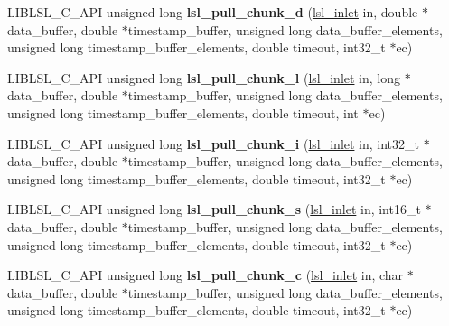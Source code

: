 \begin{DoxyCompactItemize}
\item 
\mbox{\label{namespacelsl_ad8e4cbb24fb74cd532abf50fe3a8d571}} 
L\+I\+B\+L\+S\+L\+\_\+\+C\+\_\+\+A\+PI unsigned long {\bfseries lsl\+\_\+pull\+\_\+chunk\+\_\+d} (\hyperlink{namespacelsl_a884a3363cfcba75d7ce8f00c1c4c54f1}{lsl\+\_\+inlet} in, double $\ast$data\+\_\+buffer, double $\ast$timestamp\+\_\+buffer, unsigned long data\+\_\+buffer\+\_\+elements, unsigned long timestamp\+\_\+buffer\+\_\+elements, double timeout, int32\+\_\+t $\ast$ec)
\item 
\mbox{\label{namespacelsl_a1f78178ddd5cb824e36d4322677bbfe9}} 
L\+I\+B\+L\+S\+L\+\_\+\+C\+\_\+\+A\+PI unsigned long {\bfseries lsl\+\_\+pull\+\_\+chunk\+\_\+l} (\hyperlink{namespacelsl_a884a3363cfcba75d7ce8f00c1c4c54f1}{lsl\+\_\+inlet} in, long $\ast$data\+\_\+buffer, double $\ast$timestamp\+\_\+buffer, unsigned long data\+\_\+buffer\+\_\+elements, unsigned long timestamp\+\_\+buffer\+\_\+elements, double timeout, int $\ast$ec)
\item 
\mbox{\label{namespacelsl_a5f10ff6b4a4ff08c0e9f78d41c495c60}} 
L\+I\+B\+L\+S\+L\+\_\+\+C\+\_\+\+A\+PI unsigned long {\bfseries lsl\+\_\+pull\+\_\+chunk\+\_\+i} (\hyperlink{namespacelsl_a884a3363cfcba75d7ce8f00c1c4c54f1}{lsl\+\_\+inlet} in, int32\+\_\+t $\ast$data\+\_\+buffer, double $\ast$timestamp\+\_\+buffer, unsigned long data\+\_\+buffer\+\_\+elements, unsigned long timestamp\+\_\+buffer\+\_\+elements, double timeout, int32\+\_\+t $\ast$ec)
\item 
\mbox{\label{namespacelsl_a577a886ca87effb6b93a295466b9c933}} 
L\+I\+B\+L\+S\+L\+\_\+\+C\+\_\+\+A\+PI unsigned long {\bfseries lsl\+\_\+pull\+\_\+chunk\+\_\+s} (\hyperlink{namespacelsl_a884a3363cfcba75d7ce8f00c1c4c54f1}{lsl\+\_\+inlet} in, int16\+\_\+t $\ast$data\+\_\+buffer, double $\ast$timestamp\+\_\+buffer, unsigned long data\+\_\+buffer\+\_\+elements, unsigned long timestamp\+\_\+buffer\+\_\+elements, double timeout, int32\+\_\+t $\ast$ec)
\item 
\mbox{\label{namespacelsl_ad160ae0261a0b604b5ebae8a7cf30f00}} 
L\+I\+B\+L\+S\+L\+\_\+\+C\+\_\+\+A\+PI unsigned long {\bfseries lsl\+\_\+pull\+\_\+chunk\+\_\+c} (\hyperlink{namespacelsl_a884a3363cfcba75d7ce8f00c1c4c54f1}{lsl\+\_\+inlet} in, char $\ast$data\+\_\+buffer, double $\ast$timestamp\+\_\+buffer, unsigned long data\+\_\+buffer\+\_\+elements, unsigned long timestamp\+\_\+buffer\+\_\+elements, double timeout, int32\+\_\+t $\ast$ec)

\end{DoxyCompactItemize}
